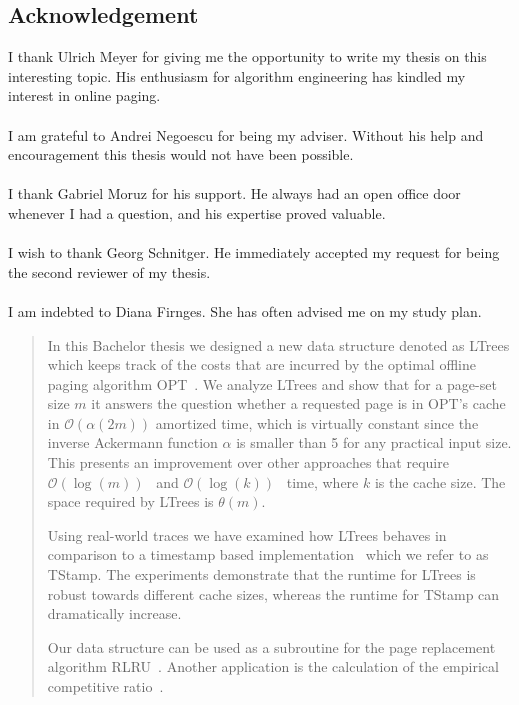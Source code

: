 \documentclass[a4paper,12pt, titlepage]{article}  %
\newcommand{\oh}{\mathcal{O}}   %
\begin{document}
\subsection*{Acknowledgement}
I thank Ulrich Meyer for giving me the opportunity to write my thesis on this interesting topic. 
His enthusiasm for algorithm engineering has kindled my interest in online paging.\\
\\
I am grateful to Andrei Negoescu for being my adviser. Without his help and encouragement this thesis
would not have been possible. \\
\\
I thank Gabriel Moruz for his support. He always had an open office door whenever I had a question,
and his expertise proved valuable.\\ 
\\
I wish to thank Georg Schnitger. He immediately accepted my request for being the second reviewer
of my thesis.\\
\\
I am indebted to Diana Firnges. She has often advised me on my study plan.



\begin{abstract}
In this Bachelor thesis we designed a new data structure denoted as LTrees which keeps track of 
the costs that are incurred by the optimal offline paging algorithm OPT~\cite{belady66_opt}. We analyze LTrees and show 
that for a page-set size $m$ it answers the question whether a requested page is in OPT's cache in $\oh(\alpha(2m))$ amortized time, which 
is virtually constant since the inverse Ackermann function $\alpha$ is smaller than 5 for any practical input size.
This presents an improvement over other approaches that require $\oh(\log(m))$~\cite{boyar07} and $\oh(\log(k))$~\cite{brodal11} time, 
where $k$ is the cache size. The space required by LTrees is $\theta(m)$.

Using real-world traces we have examined how LTrees behaves in comparison to a timestamp based 
implementation~\cite{sea12_paper} which we refer to as TStamp. The experiments demonstrate that the runtime 
for LTrees is robust towards different cache sizes, whereas the runtime for TStamp 
can dramatically increase. 

Our data structure can be used as a subroutine for the page replacement algorithm RLRU~\cite{boyar07}. Another application  
is the calculation of the empirical competitive ratio~\cite{moruz_soda12}.

\end{abstract}
\end{document}
